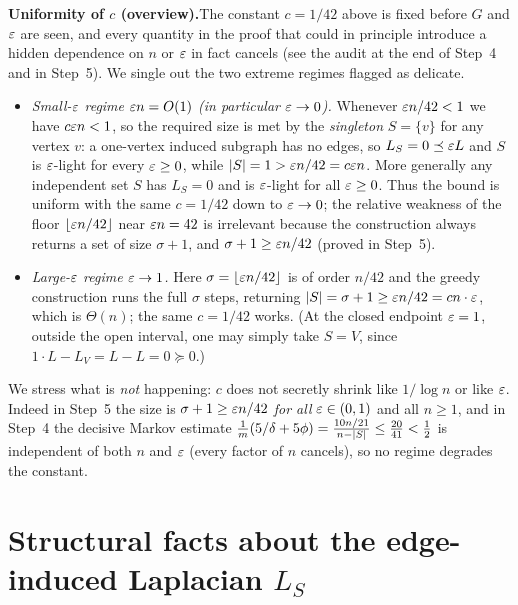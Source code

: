 \medskip
\noindent\textbf{Uniformity of $c$ (overview).}\quad The constant $c=1/42$ above
is fixed before $G$ and $\varepsilon$ are seen, and every quantity in the proof that
could in principle introduce a hidden dependence on $n$ or $\varepsilon$ in fact
cancels (see the audit at the end of Step~4 and in Step~5). We single out the two
extreme regimes flagged as delicate.
\begin{itemize}
\item\emph{Small-$\varepsilon$ regime $\varepsilon n=O(1)$ \textup{(}in particular
$\varepsilon\to0$\textup{)}.} Whenever $\varepsilon n/42<1$ we have $c\varepsilon n<1$, so
the required size is met by the \emph{singleton} $S=\{v\}$ for any vertex $v$:
a one-vertex induced subgraph has no edges, so $L_S=0\preceq\varepsilon L$ and $S$ is
$\varepsilon$-light for every $\varepsilon\ge0$, while $|S|=1>\varepsilon n/42=c\varepsilon n$.
More generally any independent set $S$ has $L_S=0$ and is $\varepsilon$-light for all
$\varepsilon\ge0$. Thus the bound is uniform with the same $c=1/42$ down to
$\varepsilon\to0$; the relative weakness of the floor $\lfloor\varepsilon n/42\rfloor$
near $\varepsilon n=42$ is irrelevant because the construction always returns a set of
size $\sigma+1$, and $\sigma+1\ge\varepsilon n/42$ (proved in Step~5).
\item\emph{Large-$\varepsilon$ regime $\varepsilon\to1$.} Here $\sigma=\lfloor\varepsilon
n/42\rfloor$ is of order $n/42$ and the greedy construction runs the full
$\sigma$ steps, returning $|S|=\sigma+1\ge\varepsilon n/42=cn\cdot\varepsilon$, which is
$\Theta(n)$; the same $c=1/42$ works. \textup{(}At the closed endpoint
$\varepsilon=1$, outside the open interval, one may simply take $S=V$, since
$1\cdot L-L_V=L-L=0\succeq0$.\textup{)}
\end{itemize}
\noindent We stress what is \emph{not} happening: $c$ does not secretly shrink
like $1/\log n$ or like $\varepsilon$. Indeed in Step~5 the size is $\sigma+1\ge
\varepsilon n/42$ \emph{for all} $\varepsilon\in(0,1)$ and all $n\ge1$, and in Step~4 the
decisive Markov estimate $\frac1m(5/\delta+5\phi)=\frac{10n/21}{\,n-|S|\,}\le
\frac{20}{41}<\frac12$ is independent of both $n$ and $\varepsilon$ (every factor of
$n$ cancels), so no regime degrades the constant.

\section*{Structural facts about the edge-induced Laplacian $L_S$}

